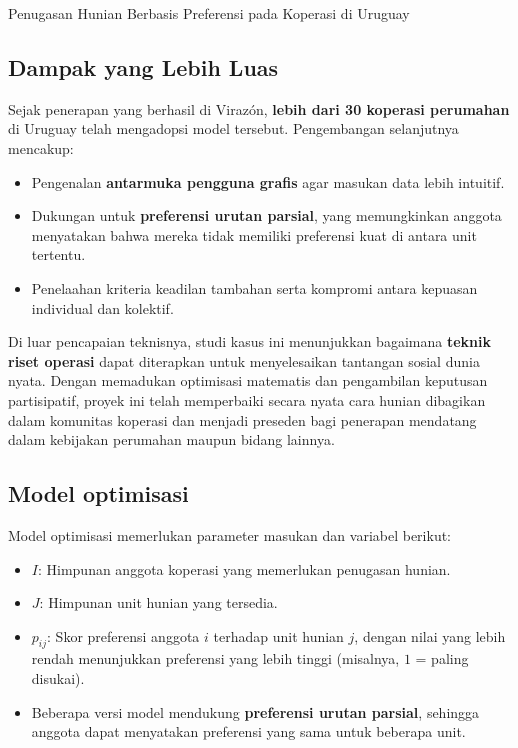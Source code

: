 \begin{casestudybox}{Penugasan Hunian Berbasis Preferensi pada Koperasi di Uruguay}
\subsection*{Dampak yang Lebih Luas}
Sejak penerapan yang berhasil di Virazón, \textbf{lebih dari 30 koperasi perumahan} di Uruguay telah mengadopsi model tersebut. Pengembangan selanjutnya mencakup:
\begin{itemize}
    \item Pengenalan \textbf{antarmuka pengguna grafis} agar masukan data lebih intuitif.
    \item Dukungan untuk \textbf{preferensi urutan parsial}, yang memungkinkan anggota menyatakan bahwa mereka tidak memiliki preferensi kuat di antara unit tertentu.
    \item Penelaahan kriteria keadilan tambahan serta kompromi antara kepuasan individual dan kolektif.
\end{itemize}

Di luar pencapaian teknisnya, studi kasus ini menunjukkan bagaimana \textbf{teknik riset operasi} dapat diterapkan untuk menyelesaikan tantangan sosial dunia nyata. Dengan memadukan optimisasi matematis dan pengambilan keputusan partisipatif, proyek ini telah memperbaiki secara nyata cara hunian dibagikan dalam komunitas koperasi dan menjadi preseden bagi penerapan mendatang dalam kebijakan perumahan maupun bidang lainnya.

\subsection*{Model optimisasi}

Model optimisasi memerlukan parameter masukan dan variabel berikut:

\begin{itemize}
    \item $I$: Himpunan anggota koperasi yang memerlukan penugasan hunian.
    \item $J$: Himpunan unit hunian yang tersedia.
\end{itemize}

\begin{itemize}
    \item $p_{ij}$: Skor preferensi anggota $i$ terhadap unit hunian $j$, dengan nilai yang lebih rendah menunjukkan preferensi yang lebih tinggi (misalnya, $1$ = paling disukai).
    \item Beberapa versi model mendukung \textbf{preferensi urutan parsial}, sehingga anggota dapat menyatakan preferensi yang sama untuk beberapa unit.
\end{itemize}


\end{casestudybox}
